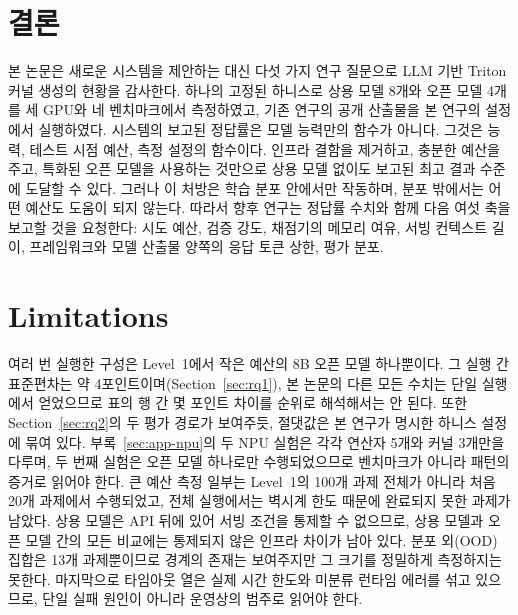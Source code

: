 \documentclass[11pt]{article}
\begin{document}
\section{결론}\label{sec:conclusion}

본 논문은 새로운 시스템을 제안하는 대신 다섯 가지 연구 질문으로 LLM 기반 Triton 커널 생성의 현황을
감사한다. 하나의 고정된 하니스로 상용 모델 8개와 오픈 모델 4개를 세 GPU와 네 벤치마크에서 측정하였고,
기존 연구의 공개 산출물을 본 연구의 설정에서 실행하였다. 시스템의 보고된 정답률은 모델 능력만의
함수가 아니다. 그것은 능력, 테스트 시점 예산, 측정 설정의 함수이다. 인프라 결함을 제거하고, 충분한
예산을 주고, 특화된 오픈 모델을 사용하는 것만으로 상용 모델 없이도 보고된 최고 결과 수준에 도달할 수
있다. 그러나 이 처방은 학습 분포 안에서만 작동하며, 분포 밖에서는 어떤 예산도 도움이 되지 않는다.
따라서 향후 연구는 정답률 수치와 함께 다음 여섯 축을 보고할 것을 요청한다: 시도 예산, 검증 강도,
채점기의 메모리 여유, 서빙 컨텍스트 길이, 프레임워크와 모델 산출물 양쪽의 응답 토큰 상한, 평가 분포.

\section*{Limitations}

여러 번 실행한 구성은 Level~1에서 작은 예산의 8B 오픈 모델 하나뿐이다. 그 실행 간 표준편차는 약
4포인트이며(Section~\ref{sec:rq1}), 본 논문의 다른 모든 수치는 단일 실행에서 얻었으므로 표의 행 간
몇 포인트 차이를 순위로 해석해서는 안 된다. 또한 Section~\ref{sec:rq2}의 두 평가 경로가 보여주듯,
절댓값은 본 연구가 명시한 하니스 설정에 묶여 있다. 부록~\ref{sec:app-npu}의 두 NPU 실험은 각각 연산자 5개와 커널 3개만을
다루며, 두 번째 실험은 오픈 모델 하나로만 수행되었으므로 벤치마크가 아니라 패턴의 증거로 읽어야 한다. 큰 예산 측정 일부는 Level~1의 100개 과제 전체가
아니라 처음 20개 과제에서 수행되었고, 전체 실행에서는 벽시계 한도 때문에 완료되지 못한 과제가 남았다.
상용 모델은 API 뒤에 있어 서빙 조건을 통제할 수 없으므로, 상용 모델과 오픈 모델 간의 모든 비교에는
통제되지 않은 인프라 차이가 남아 있다. 분포 외(OOD) 집합은 13개 과제뿐이므로 경계의 존재는 보여주지만
그 크기를 정밀하게 측정하지는 못한다. 마지막으로 타임아웃 열은 실제 시간 한도와 미분류 런타임 에러를
섞고 있으므로, 단일 실패 원인이 아니라 운영상의 범주로 읽어야 한다.
\end{document}
